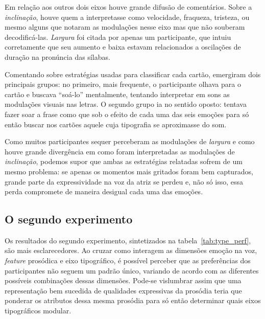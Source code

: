 \documentclass[a4paper]{tufte-handout}
\begin{document}
Em relação aos outros dois eixos houve grande difusão de comentários. Sobre a \textit{inclinação}, houve quem a interpretasse como velocidade, fraqueza, tristeza, ou mesmo alguns que notaram as modulações nesse eixo mas que não souberam decodificá-las. \textit{Largura} foi citada por apenas um participante, que intuiu corretamente que seu aumento e baixa estavam relacionados a oscilações de duração na pronúncia das sílabas.

Comentando sobre estratégias usadas para classificar cada cartão, emergiram dois principais grupos: no primeiro, mais frequente, o participante olhava para o cartão e buscava ``soá-lo'' mentalmente, tentando interpretar em sons as modulações visuais nas letras. O segundo grupo ia no sentido oposto: tentava fazer soar a frase como que sob o efeito de cada uma das seis emoções para só então buscar nos cartões aquele cuja tipografia se aproximasse do som.

Como muitos participantes sequer perceberam as modulações de \textit{largura} e como houve grande divergência em como foram interpretadas as modulações de \textit{inclinação}, podemos supor que ambas as estratégias relatadas sofrem de um mesmo problema: se apenas os momentos mais gritados foram bem capturados, grande parte da expressividade na voz da atriz se perdeu e, não só isso, essa perda compromete de maneira desigual cada uma das emoções.

\subsection{O segundo experimento}

Os resultados do segundo experimento, sintetizados na tabela~\ref{tab:type_perf}, são mais esclarecedores. Ao cruzar como interagem as dimensões emoção na voz, \textit{feature} prosódica e eixo tipográfico, é possível perceber que as preferências dos participantes não seguem um padrão único, variando de acordo com as diferentes possíveis combinações dessas dimensões. Pode-se vislumbrar assim que uma representação bem sucedida de qualidades expressivas da prosódia teria que ponderar os atributos dessa mesma prosódia para só então determinar quais eixos tipográficos modular.
\end{document}
